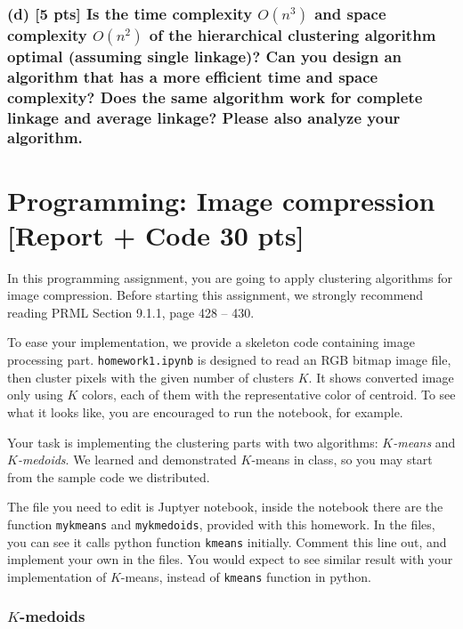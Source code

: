 \documentclass[twoside,10pt]{article}
\begin{document}
\subsubsection*{(d) [5 pts] Is the time complexity $O(n^3)$ and space complexity $O(n^2)$ of the hierarchical clustering algorithm optimal (assuming single linkage)? Can you design an algorithm that has a more efficient time and space complexity? Does the same algorithm work for complete linkage and average linkage? Please also analyze your algorithm.}


\vspace{1cm}



\section{Programming: Image compression [Report + Code 30 pts]}

In this programming assignment, you are going to apply clustering algorithms for image compression. Before starting this assignment, we strongly recommend reading PRML Section 9.1.1, page 428 -- 430.

To ease your implementation, we provide a skeleton code containing image processing part. \texttt{homework1.ipynb} is designed to read an RGB bitmap image file, then cluster pixels with the given number of clusters $K$. It shows converted image only using $K$ colors, each of them with the representative color of centroid. To see what it looks like, you are encouraged to run the notebook, for example.

Your task is implementing the clustering parts with two algorithms: \emph{$K$-means} and \emph{$K$-medoids}. We learned and demonstrated $K$-means in class, so you may start from the sample code we distributed.

The file you need to edit is Juptyer notebook, inside the notebook there are the function \texttt{mykmeans} and \texttt{mykmedoids}, provided with this homework. In the files, you can see it calls python function \texttt{kmeans} initially. Comment this line out, and implement your own in the files. You would expect to see similar result with your implementation of $K$-means, instead of \texttt{kmeans} function in python.

\subsubsection*{$K$-medoids}
\end{document}
